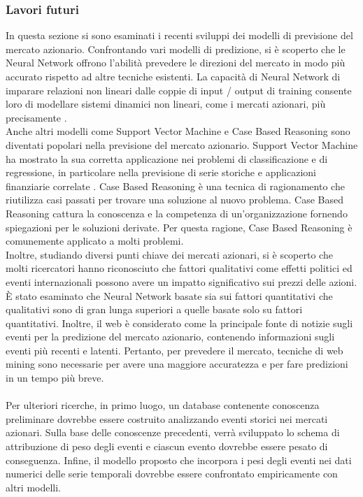 \documentclass[a4paper,12pt]{report}
\begin{document}
\subsubsection{Lavori futuri}
In questa sezione si sono esaminati i recenti sviluppi dei modelli di previsione del mercato azionario. Confrontando vari modelli di predizione, si è scoperto che le Neural Network offrono l'abilità prevedere le direzioni del mercato in modo più accurato rispetto ad altre tecniche esistenti. La capacità di Neural Network di imparare relazioni non lineari dalle coppie di input / output di training consente loro di modellare sistemi dinamici non lineari, come i mercati azionari, più precisamente \cite{23}.\\Anche altri modelli come Support Vector Machine e Case Based Reasoning sono diventati popolari nella previsione del mercato azionario. Support Vector Machine ha mostrato la sua corretta applicazione nei problemi di classificazione e di regressione, in particolare nella previsione di serie storiche e applicazioni finanziarie correlate \cite{46}. Case Based Reasoning è una tecnica di ragionamento che riutilizza casi passati per trovare una soluzione al nuovo problema. Case Based Reasoning cattura la conoscenza e la competenza di un'organizzazione fornendo spiegazioni per le soluzioni derivate. Per questa ragione, Case Based Reasoning è comunemente applicato a molti problemi.\\Inoltre, studiando diversi punti chiave dei mercati azionari, si è scoperto che molti ricercatori hanno riconosciuto che fattori qualitativi come effetti politici ed eventi internazionali possono avere un impatto significativo sui prezzi delle azioni. È stato esaminato che Neural Network basate sia sui fattori quantitativi che qualitativi sono di gran lunga superiori a quelle basate solo su fattori quantitativi. Inoltre, il web è considerato come la principale fonte di notizie sugli eventi per la predizione del mercato azionario, contenendo informazioni sugli eventi più recenti e latenti. Pertanto, per prevedere il mercato, tecniche di web mining sono necessarie per avere una maggiore accuratezza e per fare predizioni in un tempo più breve.\\~\\ Per ulteriori ricerche, in primo luogo, un database contenente conoscenza preliminare dovrebbe essere costruito analizzando eventi storici nei mercati azionari. Sulla base delle conoscenze precedenti, verrà sviluppato lo schema di attribuzione di peso degli eventi e ciascun evento dovrebbe essere pesato di conseguenza. Infine, il modello proposto che incorpora i pesi degli eventi nei dati numerici delle serie temporali dovrebbe essere confrontato empiricamente con altri modelli.
\end{document}
